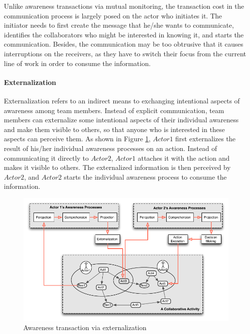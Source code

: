 Unlike awareness transactions via mutual monitoring, the transaction cost in the communication process is largely posed on the actor who initiates it. The initiator needs to first create the message that he/she wants to communicate, identifies the collaborators who might be interested in knowing it, and starts the communication. Besides, the communication may be too obtrusive that it causes interruptions on the receivers, as they have to switch their focus from the current line of work in order to consume the information.

\paragraph*{Externalization} %
\label{par:externalization}
Externalization refers to an indirect means to exchanging intentional aspects of awareness among team members. Instead of explicit communication, team members can externalize some intentional aspects of their individual awareness and make them visible to others, so that anyone who is interested in these aspects can perceive them. As shown in Figure \ref{fig:trans_externalization}, $Actor1$ first externalizes the result of his/her individual awareness processes on an action. Instead of communicating it directly to $Actor2$, $Actor1$ attaches it with the action and makes it visible to others. The externalized information is then perceived by $Actor2$, and $Actor2$ starts the individual awareness process to consume the information.

\begin{figure}[htbp] %
   \centering
   \includegraphics{trans_externalization.pdf} 
   \caption{Awareness transaction via externalization}
   \label{fig:trans_externalization}
\end{figure}

